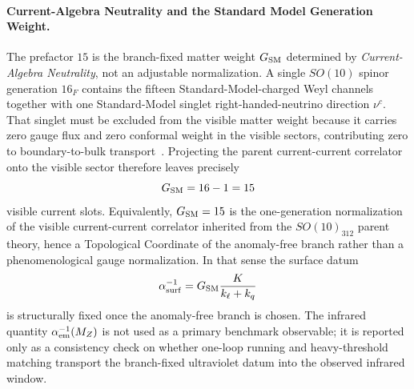 \documentclass[11pt]{article}
\begin{document}
\paragraph{Current-Algebra Neutrality and the Standard Model Generation Weight.}
The prefactor $15$ is the branch-fixed matter weight $G_{\rm SM}$ determined by \emph{Current-Algebra Neutrality}, not an adjustable normalization. A single $SO(10)$ spinor generation $16_F$ contains the fifteen Standard-Model-charged Weyl channels together with one Standard-Model singlet right-handed-neutrino direction $\nu^c$. That singlet must be excluded from the visible matter weight because it carries zero gauge flux and zero conformal weight in the visible sectors, contributing zero to boundary-to-bulk transport~\cite{gko1985,friedan1987,witten1989}. Projecting the parent current-current correlator onto the visible sector therefore leaves precisely
\begin{equation}
 G_{\rm SM}=16-1=15
\end{equation}
visible current slots. Equivalently, $G_{\rm SM}=15$ is the one-generation normalization of the visible current-current correlator inherited from the $SO(10)_{312}$ parent theory, hence a Topological Coordinate of the anomaly-free branch rather than a phenomenological gauge normalization. In that sense the surface datum
\begin{equation}
 \alpha^{-1}_{\rm surf}=G_{\rm SM}\frac{K}{k_{\ell}+k_q}
\end{equation}
is structurally fixed once the anomaly-free branch is chosen. The infrared quantity $\alpha^{-1}_{\rm em}(M_Z)$ is not used as a primary benchmark observable; it is reported only as a consistency check on whether one-loop running and heavy-threshold matching transport the branch-fixed ultraviolet datum into the observed infrared window.
\end{document}
